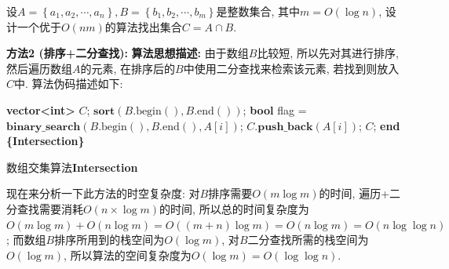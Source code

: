 \documentclass{article}
\begin{document}
\pagebreak


\begin{homeworkProblem}
	设$A=\left\{ a_1,a_2,\cdots ,a_n \right\} ,B=\left\{ b_1,b_2,\cdots ,b_m \right\}$是整数集合, 其中$m=O(\log n)$, 设计一个优于$O(nm)$的算法找出集合$C=A\cap B$.
	

	\solution

	\textbf{方法2 (排序+二分查找):} \textbf{算法思想描述:} 由于数组$B$比较短, 所以先对其进行排序, 然后遍历数组$A$的元素, 在排序后的$B$中使用二分查找来检索该元素, 若找到则放入$C$中. 算法伪码描述如下:
	\begin{algorithm}[H]
		\begin{algorithmic}[1]
		\State \textbf{vector<int>} $C$;
		\State $\textbf{sort}(B.\text{begin}(), B.\text{end}())$;  
			\State \textbf{bool} flag = $\textbf{binary_search}(B.\text{begin}(), B.\text{end}(), A[i])$;
				\State $C.\textbf{push_back}(A[i])$;
			\EndIf
		\EndFor
		\State \Return $C$;
		\State \textbf{end \{Intersection\}} 
		\end{algorithmic}
		\caption{数组交集算法\textbf{Intersection}}
		\label{alg:交集算法}
	\end{algorithm}
	现在来分析一下此方法的时空复杂度: 对$B$排序需要$O(m\log m)$的时间, 遍历+二分查找需要消耗$O(n\times \log m)$的时间, 所以总的时间复杂度为$O\left( m\log m \right) +O\left( n\log m \right) =O\left( \left( m+n \right) \log m \right) =O\left( n\log m \right) =O\left( n\log\log n \right)$; 而数组$B$排序所用到的栈空间为$O(\log m)$, 对$B$二分查找所需的栈空间为$O(\log m)$, 所以算法的空间复杂度为$O(\log m)=O(\log \log n)$.
	\newpage
\end{homeworkProblem}


\pagebreak
\end{document}
